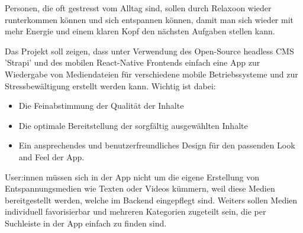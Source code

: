 
Personen, die oft gestresst vom Alltag sind, sollen durch Relaxoon wieder runterkommen können
und sich entspannen können, damit man sich wieder mit mehr Energie und einem klaren Kopf den
nächsten Aufgaben stellen kann.

Das Projekt soll zeigen, dass unter Verwendung des Open-Source headless CMS 'Strapi' und des mobilen
React-Native Frontends einfach eine App zur Wiedergabe von Mediendateien für verschiedene mobile Betriebssysteme
und zur Stressbewältigung erstellt werden kann. Wichtig ist dabei: 

\begin{itemize}
    \item Die Feinabstimmung der Qualität der Inhalte
    \item Die optimale Bereitstellung der sorgfältig ausgewählten Inhalte
    \item Ein ansprechendes und benutzerfreundliches Design für den passenden Look and Feel der App.
\end{itemize}

User:innen müssen sich in der App nicht um die eigene Erstellung von Entspannungsmedien wie Texten oder Videos
kümmern, weil diese Medien bereitgestellt werden, welche im Backend eingepflegt sind. Weiters sollen Medien
individuell favorisierbar und mehreren Kategorien zugeteilt sein, die per Suchleiste in der App einfach zu
finden sind.

